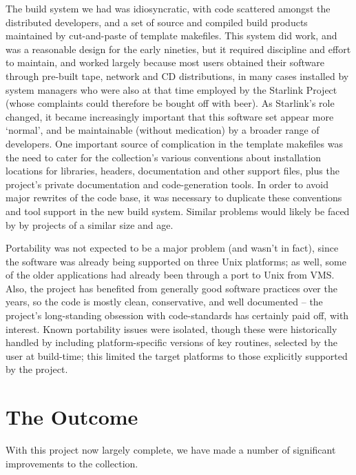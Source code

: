 \documentclass{speauth}
\begin{document}
The build system we had was idiosyncratic, with code scattered amongst
the distributed developers, and a set of source and compiled build
products maintained by cut-and-paste of template makefiles.  This
system did work, and was a reasonable design for the early nineties,
but it required discipline and effort to maintain, and worked largely
because most users obtained their software through pre-built tape, network and
CD distributions, in many cases installed by system managers who were
also at that time employed by the Starlink Project (whose complaints
could therefore be bought off with beer).  As Starlink's
role changed, it became increasingly important that this software set
appear more `normal', and be maintainable (without medication) by a
broader range of developers.  One important source of complication in the
template makefiles was the need to cater for the collection's various
conventions about installation locations for libraries, headers,
documentation and other support files, plus the project's private
documentation and code-generation tools.  In order to avoid major
rewrites of the code base, it was necessary to duplicate these
conventions and tool support in the new build system.  Similar
problems would likely be faced by by projects of a similar size and age.

Portability was not expected to be a major problem (and wasn't in
fact), since the software was already being supported on three Unix
platforms; as well, some of the older applications had already been
through a port to Unix from VMS.  Also, the project has benefited from
generally good software practices over the years, so the code is
mostly clean, conservative, and well documented -- the project's
long-standing obsession with code-standards has certainly paid off,
with interest.  Known portability issues were isolated, though these
were historically handled by including platform-specific versions of
key routines, selected by the user at build-time; this limited the
target platforms to those explicitly supported by the project.




\section{The Outcome}
\label{s:result}

With this project now largely complete, we have made a number of
significant improvements to the collection.
\end{document}
